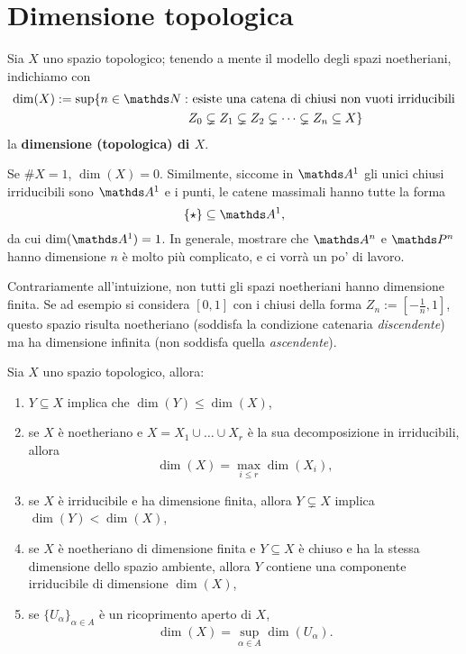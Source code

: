 \documentclass[twoside,openright,titlepage,numbers=noenddot,%
               headinclude,footinclude,cleardoublepage=empty,abstract=on,
               BCOR=23mm,paper=letter,fontsize=11pt
               ]{scrreprt}
\begin{document}
\section{Dimensione topologica}
Sia $X$ uno spazio topologico; tenendo a mente il modello degli spazi noetheriani, indichiamo con
\begin{align*} 
    \dim(X) := \sup \{n \in \NN:& \ \text{esiste una catena di chiusi non vuoti irriducibili}\\ \ &Z_0 \subsetneq Z_1 \subsetneq Z_2 \subsetneq \dots \subsetneq Z_n \subseteq X\}
\end{align*}
la \textbf{dimensione (topologica) di $X$}.
\begin{example}
    Se $\# X = 1$, $\dim(X) = 0$. Similmente, siccome in $\AA^1$ gli unici chiusi irriducibili sono $\AA^1$ e i punti, le catene massimali hanno tutte la forma
    \[ \{\star\} \subseteq \AA^1, \]
    da cui $\dim(\AA^1) = 1$. In generale, mostrare che $\AA^n$ e $\PP^n$ hanno dimensione $n$ è molto più complicato, e ci vorrà un po' di lavoro.
\end{example}
\begin{remark}
    Contrariamente all'intuizione, non tutti gli spazi noetheriani hanno dimensione finita. Se ad esempio si considera $[0,1]$ con i chiusi della forma $Z_n := [-\frac{1}{n}, 1]$, questo spazio risulta noetheriano (soddisfa la condizione catenaria \textit{discendente}) ma ha dimensione infinita (non soddisfa quella \textit{ascendente}).
\end{remark}
\begin{proposition}
    Sia $X$ uno spazio topologico, allora:
    \begin{enumerate}
        \item $Y \subseteq X$ implica che $\dim(Y) \leq \dim(X)$,
        \item se $X$ è noetheriano e $X = X_1 \cup \dots \cup X_r$ è la sua decomposizione in irriducibili, allora
        \[ \dim(X) = \max_{i\leq r}\dim(X_i), \]
        \item se $X$ è irriducibile e ha dimensione finita, allora $Y \subsetneq X$ implica $\dim(Y) < \dim(X)$,
        \item se $X$ è noetheriano di dimensione finita e $Y \subseteq X$ è chiuso e ha la stessa dimensione dello spazio ambiente, allora $Y$ contiene una componente irriducibile di dimensione $\dim(X)$,
        \item se $\{U_\alpha\}_{\alpha \in A}$ è un ricoprimento aperto di $X$,
        \[ \dim(X) = \sup_{\alpha \in A} \dim(U_\alpha). \]
    \end{enumerate}
\end{proposition}
\end{document}

